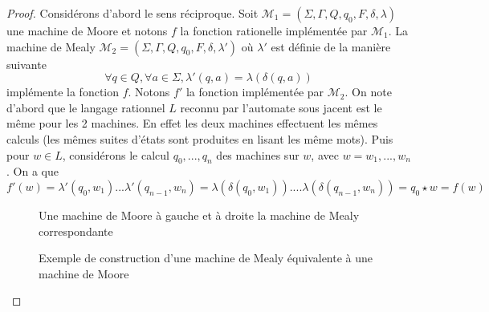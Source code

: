 \documentclass{scrartcl}
\begin{document}
\begin{flushleft}
\begin{proof}
    Considérons d'abord le sens réciproque. Soit $\mathcal{M}_1 = (\Sigma, \Gamma, Q, q_0, F, \delta, \lambda)$ une machine de Moore et notons $f$ la
    fonction rationelle implémentée par $\mathcal{M}_1$. La machine de Mealy $\mathcal{M}_2 = (\Sigma, \Gamma, Q, q_0, F, \delta, \lambda')$ où
    $\lambda'$ est définie de la manière suivante
    \[ \forall q \in Q, \forall a \in \Sigma, \lambda'(q, a) = \lambda(\delta(q, a)) \]
    implémente la fonction $f$. Notons $f'$ la fonction implémentée par $\mathcal{M}_2$. On note d'abord que le langage rationnel $L$ reconnu par l'automate
    sous jacent est le même pour les 2 machines. En effet les deux machines effectuent les mêmes calculs (les mêmes suites d'états sont produites
    en lisant les même mots). Puis pour $w \in L$, considérons le calcul $q_0, ..., q_n$ des machines sur $w$, avec $w = w_1, ..., w_n$. On a que
    \[ f'(w) = \lambda'(q_0, w_1) ... \lambda'(q_{n-1}, w_n) = \lambda(\delta(q_0, w_1)) .... \lambda(\delta(q_{n-1}, w_n)) = q_0 \star w = f(w) \]
    \begin{figure}[h]
        \caption{Exemple de construction d'une machine de Mealy équivalente à une machine de Moore}
        \begin{center}
        Une machine de Moore à gauche et à droite la machine de Mealy correspondante
        \end{center}
    \end{figure}


\end{proof}
\end{flushleft}
\end{document}
